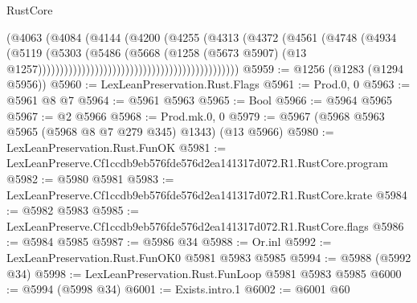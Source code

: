 \begin{lexlean}{RustCore}
\begin{coremodule}
                                                                (@4063
                                                                  (@4084
                                                                    (@4144
                                                                      (@4200
                                                                        (@4255
                                                                          (@4313
                                                                            (@4372
                                                                              (@4561
                                                                                (@4748
                                                                                  (@4934
                                                                                    (@5119
                                                                                      (@5303
                                                                                        (@5486
                                                                                          (@5668
                                                                                            (@1258
                                                                                              (@5673
                                                                                                @5907)
                                                                                              (@13
                                                                                                @1257))))))))))))))))))))))))))))))))))))))))))))))
@5959 := @1256 (@1283 (@1294 @5956))
@5960 := LexLeanPreservation.Rust.Flags
@5961 := Prod.{0, 0}
@5963 := @5961 @8 @7
@5964 := @5961 @5963
@5965 := Bool
@5966 := @5964 @5965
@5967 := @2 @5966
@5968 := Prod.mk.{0, 0}
@5979 := @5967 (@5968 @5963 @5965 (@5968 @8 @7 @279 @345) @1343) (@13 @5966)
@5980 := LexLeanPreservation.Rust.FunOK
@5981 := LexLeanPreserve.Cf1ccdb9eb576fde576d2ea141317d072.R1.RustCore.program
@5982 := @5980 @5981
@5983 := LexLeanPreserve.Cf1ccdb9eb576fde576d2ea141317d072.R1.RustCore.krate
@5984 := @5982 @5983
@5985 := LexLeanPreserve.Cf1ccdb9eb576fde576d2ea141317d072.R1.RustCore.flags
@5986 := @5984 @5985
@5987 := @5986 @34
@5988 := Or.inl
@5992 := LexLeanPreservation.Rust.FunOK0 @5981 @5983 @5985
@5994 := @5988 (@5992 @34)
@5998 := LexLeanPreservation.Rust.FunLoop @5981 @5983 @5985
@6000 := @5994 (@5998 @34)
@6001 := Exists.intro.{1}
@6002 := @6001 @60

\end{coremodule}
\end{lexlean}
